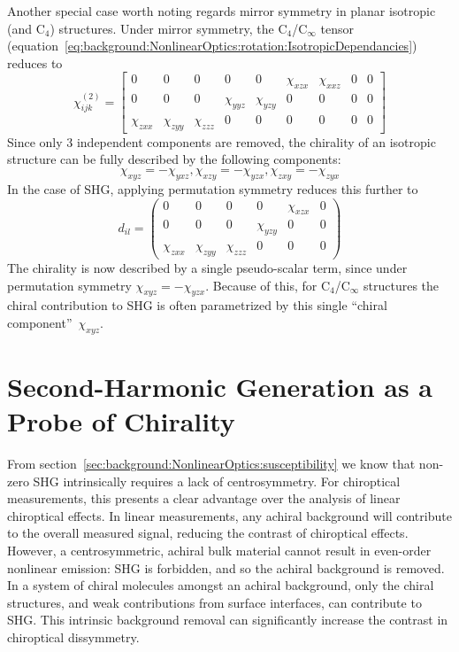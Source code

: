 Another special case worth noting regards mirror symmetry in planar isotropic (and C$_4$) structures. Under mirror symmetry, the C$_4$/C$_\infty$ tensor (equation~\ref{eq:background:NonlinearOptics:rotation:IsotropicDependancies}) reduces to
\begin{equation}\label{eq:background:NonlinearOptics:mirror:IsotropicMirrorChi}
	\chi^{(2)}_{ijk} =
	\begin{bmatrix}
		0 & 0 & 0 & 0 & 0 & \chi_{xzx} & \chi_{xxz} & 0 & 0\\ 
		0 & 0 & 0 & \chi_{yyz} & \chi_{yzy} & 0 & 0 & 0 & 0\\ 
		\chi_{zxx} & \chi_{zyy} & \chi_{zzz} & 0 & 0 & 0 & 0 & 0 & 0
	\end{bmatrix}
\end{equation}
Since only 3 independent components are removed, the chirality of an isotropic structure can be fully described by the following components:
\begin{equation}\label{eq:background:NonlinearOptics:mirror:IsoChiralComponents}
\chi_{xyz} = -\chi_{yxz}, \chi_{xzy} = -\chi_{yzx}, \chi_{zxy} = -\chi_{zyx} 
\end{equation}
In the case of SHG, applying permutation symmetry reduces this further to
\begin{equation}\label{eq:background:NonlinearOptics:mirror:ReducedIsoChiral}
	d_{il} = 
	\begin{pmatrix}
		0 & 0 & 0 & 0 & \chi_{xzx} & 0\\ 
		0 & 0 & 0 & \chi_{yzy} & 0 & 0\\ 
		\chi_{zxx} & \chi_{zyy} & \chi_{zzz} & 0 & 0 & 0
	\end{pmatrix} 
\end{equation}
The chirality is now described by a single pseudo-scalar term, since under permutation symmetry $\chi_{xyz} = -\chi_{yzx}$. Because of this, for C$_4$/C$_\infty$ structures the chiral contribution to SHG is often parametrized by this single ``chiral component''~$\chi_{xyz}$.

\section{Second-Harmonic Generation as a Probe of Chirality}\label{sec:background:NonlinearOptics:chirality}

From section~\ref{sec:background:NonlinearOptics:susceptibility} we know that non-zero SHG intrinsically requires a lack of centrosymmetry. For chiroptical measurements, this presents a clear advantage over the analysis of linear chiroptical effects. In linear measurements, any achiral background will contribute to the overall measured signal, reducing the contrast of chiroptical effects. However, a centrosymmetric, achiral bulk material cannot result in even-order nonlinear emission: SHG is forbidden, and so the achiral background is removed. In a system of chiral molecules amongst an achiral background, only the chiral structures, and weak contributions from surface interfaces, can contribute to SHG. This intrinsic background removal can significantly increase the contrast in chiroptical dissymmetry.

